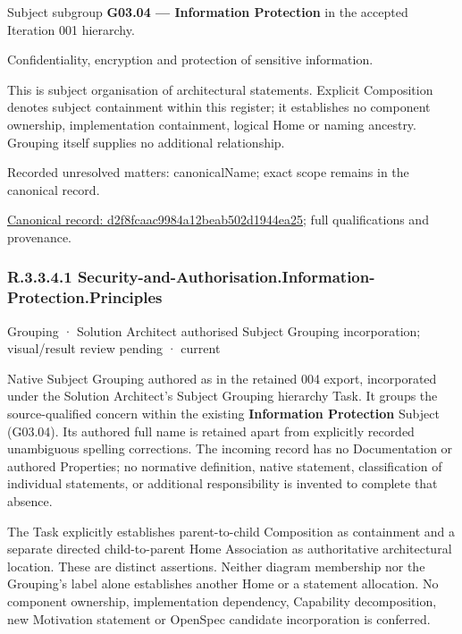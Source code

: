 Subject subgroup \textbf{G03.04 — Information Protection} in the accepted Iteration 001 hierarchy.



Confidentiality, encryption and protection of sensitive information.



This is subject organisation of architectural statements. Explicit Composition denotes subject containment within this register; it establishes no component ownership, implementation containment, logical Home or naming ancestry. Grouping itself supplies no additional relationship.


{\small Recorded unresolved matters: canonicalName; exact scope remains in the canonical record.}\par
{\footnotesize \href{../../../../continuum/grouping/d2f8fcaac9984a12beab502d1944ea25.md}{Canonical record: d2f8fcaac9984a12beab502d1944ea25}; full qualifications and provenance.}\par
\subsubsection*{R.3.3.4.1 Security-and-Authorisation.Information-Protection.Principles}
\label{navigation:R.3.3.4.1}

\label{element:1cdc1ee62ec548998a8db6ee23b59ca1}
{\small Grouping · Solution Architect authorised Subject Grouping incorporation; visual/result review pending · current}\par

Native Subject Grouping authored as \texttt{} in the retained 004 export,
incorporated under the Solution Architect's Subject Grouping hierarchy Task.
It groups the source-qualified \texttt{} concern within
the existing \textbf{Information Protection} Subject (G03.04). Its authored full name
is retained apart from explicitly recorded unambiguous spelling corrections.
The incoming record has no Documentation or authored Properties; no normative
definition, native statement, classification of individual statements, or
additional responsibility is invented to complete that absence.



The Task explicitly establishes parent-to-child Composition as containment and
a separate directed child-to-parent Home Association as authoritative architectural
location. These are distinct assertions. Neither diagram membership nor the
Grouping's label alone establishes another Home or a statement allocation.
No component ownership, implementation dependency, Capability decomposition,
new Motivation statement or OpenSpec candidate incorporation is conferred.



